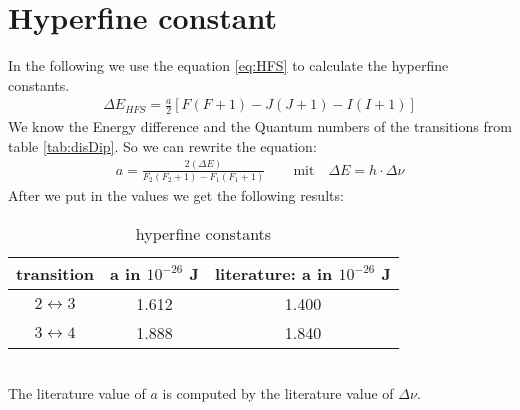 \section{Hyperfine constant}
In the following we use the equation \ref{eq:HFS} to calculate the hyperfine constants.
\begin{align}
    \label{eq:HFS}
    \Delta E_{HFS} = \frac{a}{2} [F(F+1) - J(J+1) - I(I+1)]
\end{align}
We know the Energy difference and the Quantum numbers of the transitions from table \ref{tab:disDip}. So we can rewrite the equation: 
\begin{align}
    a = \frac{2(\Delta E)}{F_2(F_2+1)-F_1(F_1+1)} \qquad \text{mit} \quad \Delta E = h \cdot \Delta \nu
\end{align}
After we put in the values we get the following results: 
\begin{table}[h]
    \centering
\begin{tabular}{c|c|c}
    transition & a in $10^{-26}$ J & literature: a in $10^{-26}$ J \\
    \hline
    $2\leftrightarrow 3$ & 1.612 & 1.400\\
    $3\leftrightarrow 4$ & 1.888 & 1.840
\end{tabular}
\caption{hyperfine constants}
\end{table} \\
The literature value of $a$ is computed by the literature value of $\Delta \nu$. 